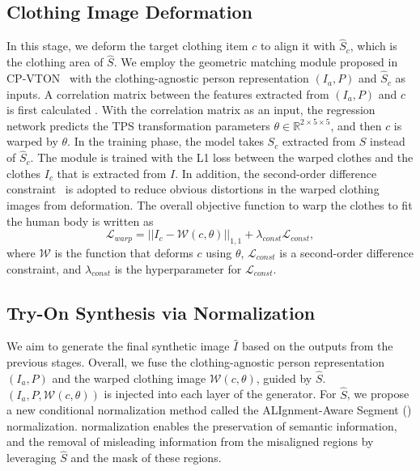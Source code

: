 \subsection{Clothing Image Deformation}\label{sec:deformation}
In this stage, we deform the target clothing item $c$ to align it with $\hat{S}_c$, which is the clothing area of $\hat{S}$.
We employ the geometric matching module proposed in CP-VTON~\cite{wang2018toward} with the clothing-agnostic person representation $(I_a, P)$ and $\hat{S}_c$ as inputs.
A correlation matrix between the features extracted from $(I_a, P)$ and $c$ is first calculated .
With the correlation matrix as an input, the regression network predicts the TPS transformation parameters $\theta \in \mathbb{R}^{2 \times 5 \times 5}$, and then $c$ is warped by $\theta$.
In the training phase, the model takes $S_c$ extracted from $S$ instead of $\hat{S}_c$.
The module is trained with the L1 loss between the warped clothes and the clothes $I_c$ that is extracted from $I$.
In addition, the second-order difference constraint~\cite{yang2020towards} is adopted to reduce obvious distortions in the warped clothing images from deformation.
The overall objective function to warp the clothes to fit the human body is written as
\begin{equation}
    \mathcal{L}_{warp} = ||I_{c} - \mathcal{W}(c, \theta)||_{1,1}
    + \lambda_{const} \mathcal{L}_{const},
\end{equation}
where $\mathcal{W}$ is the function that deforms $c$ using $\theta$, $\mathcal{L}_{const}$ is a second-order difference constraint, and $\lambda_{const}$ is the hyperparameter for $\mathcal{L}_{const}$.

\subsection{Try-On Synthesis via \norm Normalization}\label{sec:try-on synthesis}
We aim to generate the final synthetic image $\hat{I}$ based on the outputs from the previous stages.
Overall, we fuse the clothing-agnostic person representation $(I_a, P)$ and the warped clothing image $\mathcal{W}(c, \theta)$, guided by $\hat{S}$.
$(I_a, P, \mathcal{W}(c, \theta))$ is injected into each layer of the generator.
For $\hat{S}$, we propose a new conditional normalization method called the ALIgnment-Aware Segment (\norm) normalization.
\norm normalization enables the preservation of semantic information, and the removal of misleading information from the misaligned regions by leveraging $\hat{S}$ and the mask of these regions.


